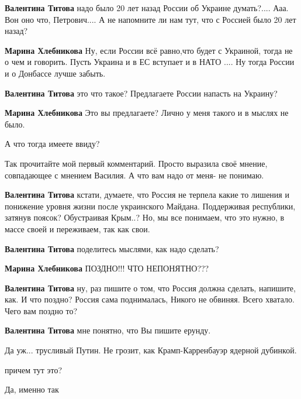 \begin{itemize}
\begin{itemize}
\textbf{Валентина Титова} надо было 20 лет назад России об Украине думать?.... Ааа. Вон оно что, Петрович.... А не напомните ли нам тут, что с Россией было 20 лет назад?

\textbf{Марина Хлебникова} Ну, если России всё равно,что будет с Украиной, тогда не о чем и говорить. Пусть Украина и в ЕС вступает и в НАТО .... Ну тогда России и о Донбассе лучше забыть.

\textbf{Валентина Титова} это что такое? Предлагаете России напасть на Украину?

\textbf{Марина Хлебникова} Это вы предлагаете? Лично у меня такого и в мыслях не было.

А что тогда имеете ввиду?

Так прочитайте мой первый комментарий. Просто выразила своё мнение, совпадающее с мнением Василия. А что вам надо от меня- не понимаю.

\textbf{Валентина Титова} кстати, думаете, что Россия не терпела какие то лишения и понижение уровня жизни после украинского Майдана. Поддерживая республики, затянув поясок? Обустраивая Крым..? Но, мы все понимаем, что это нужно, в массе своей и переживаем, так как свои.

\textbf{Валентина Титова} поделитесь мыслями, как надо сделать?

\textbf{Марина Хлебникова} ПОЗДНО!!! ЧТО НЕПОНЯТНО???

\textbf{Валентина Титова} ну, раз пишите о том, что Россия должна сделать, напишите, как. И что поздно? Россия сама поднималась, Никого не обвиняя. Всего хватало. Чего вам поздно то?

\textbf{Валентина Титова} мне понятно, что Вы пишите ерунду.
\end{itemize} %

Да уж... трусливый Путин. Не грозит, как Крамп-Карренбауэр ядерной дубинкой.

\begin{itemize} %
причем тут это?
\end{itemize} %

Да, именно так



\end{itemize}
